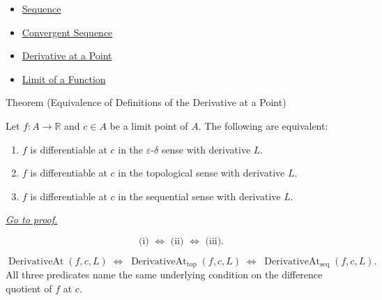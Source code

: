 \begin{dependencies}
\begin{itemize}
  \item \hyperref[def:sequence]{Sequence}
  \item \hyperref[def:convergent-sequence]{Convergent Sequence}
  \item \hyperref[def:derivative-at-a-point]{Derivative at a Point}
  \item \hyperref[def:limit-function]{Limit of a Function}
\end{itemize}
\end{dependencies}


\begin{theorembox}{Theorem (Equivalence of Definitions of the Derivative at a Point)}
\begin{theorem}
\label{thm:derivative-equivalence}
Let $f : A \to \mathbb{R}$ and $c \in A$ be a limit point of $A$. The following are equivalent:
\begin{enumerate}
  \item $f$ is differentiable at $c$ in the $\varepsilon$-$\delta$ sense with derivative $L$.
  \item $f$ is differentiable at $c$ in the topological sense with derivative $L$.
  \item $f$ is differentiable at $c$ in the sequential sense with derivative $L$.
\end{enumerate}

\smallskip\noindent
\hyperref[prf:derivative-equivalence]{\textit{Go to proof.}}
\end{theorem}
\end{theorembox}

\begin{remark*}
\[
\text{(i) } \Longleftrightarrow \text{ (ii) } \Longleftrightarrow \text{ (iii).}
\]
\end{remark*}

\begin{remark*}
\[
\operatorname{DerivativeAt}(f,c,L)
\;\Longleftrightarrow\;
\operatorname{DerivativeAt}_{\mathrm{top}}(f,c,L)
\;\Longleftrightarrow\;
\operatorname{DerivativeAt}_{\mathrm{seq}}(f,c,L).
\]
All three predicates name the same underlying condition on the difference quotient of $f$ at $c$.
\end{remark*}

